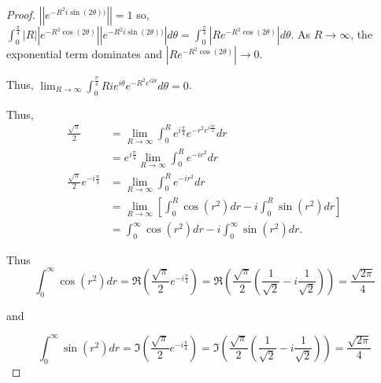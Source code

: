\documentclass{article}
\newcommand{\abs}[1]{\left\lvert #1\right\rvert}
\begin{document}
\begin{proof}
    $\abs{\abs{e^{-R^2 i \sin(2 \theta))} }} = 1$ so, $\int_{0}^{\frac{\pi}{4}}  \abs{R} \abs{e^{-R^2\cos(2\theta)}} \abs{e^{-R^2 i \sin(2 \theta))} }d \theta = \int_{0}^{\frac{\pi}{4}}  \abs{Re^{-R^2\cos(2\theta)}} d \theta$. As $R \to \infty$, the exponential term dominates and $\abs{Re^{-R^2\cos(2\theta)}} \to 0$.
    
    Thus, $\lim_{R \to \infty} \int_{0}^{\frac{\pi}{4}} Rie^{i \theta} e^{-R^2e^{i 2\theta}} d \theta = 0$.
    
    Thus, \begin{align*}
        \frac{\sqrt{\pi}}{2} &= \lim_{R \to \infty} \int_{0}^{R} e^{i \frac{\pi}{4}} e^{-r^2e^{i \frac{2\pi}{4}}} dr \\
        &= e^{i \frac{\pi}{4}} \lim_{R \to \infty} \int_{0}^{R}  e^{-ir^2} dr \\
        \frac{\sqrt{\pi}}{2} e^{-i \frac{\pi}{4}} &= \lim_{R \to \infty} \int_{0}^{R}  e^{-ir^2} dr \\
        &= \lim_{R \to \infty}\left[\int_{0}^{R} \cos(r^2) dr - i\int_{0}^{R} \sin(r^2) dr\right] \\
        &= \int_{0}^{\infty} \cos(r^2) dr - i\int_{0}^{\infty} \sin(r^2) dr.
    \end{align*}

    Thus 
    \[
        \int_{0}^{\infty} \cos(r^2) dr = \Re\left(\frac{\sqrt{\pi}}{2} e^{-i \frac{\pi}{4}}\right) = \Re\left(\frac{\sqrt{\pi}}{2}\left(\frac{1}{\sqrt{2}} - i \frac{1}{\sqrt{2}}\right)\right) = \frac{\sqrt{2 \pi}}{4}
    \]

    and 

    \[
        \int_{0}^{\infty} \sin(r^2) dr = \Im\left(\frac{\sqrt{\pi}}{2} e^{-i \frac{\pi}{4}}\right) = \Im\left(\frac{\sqrt{\pi}}{2}\left(\frac{1}{\sqrt{2}} - i \frac{1}{\sqrt{2}}\right)\right) = \frac{\sqrt{2 \pi}}{4}
    \]
\end{proof}

\bigskip
\end{document}
